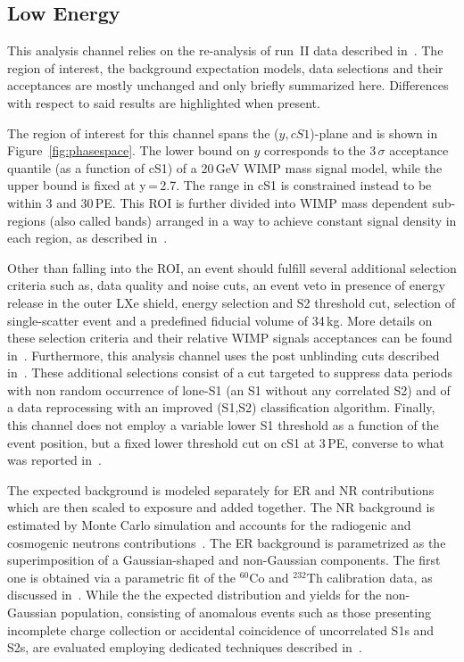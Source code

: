
\subsection{Low Energy}
\label{subsec:LowE}
This analysis channel relies on the re-analysis of run~II data described in~\cite{xe100_run_combination}. The region of interest, the background 
expectation models, data selections and their acceptances are mostly unchanged and only briefly summarized here. Differences with respect to said results are highlighted when present.

The region of interest for this channel spans the ($y,cS1$)-plane and is shown in Figure~\ref{fig:phasespace}.  The lower 
bound on $y$ corresponds to the 3\,$\sigma$ acceptance quantile (as a function of cS1) of a 20\,GeV WIMP mass signal model, while the upper bound is fixed at y\,=\,2.7.
The range in cS1 is constrained instead to be within 3 and 30\,PE. This  ROI is further divided into WIMP mass dependent sub-regions (also called bands) arranged in a way 
to achieve constant signal density in each region, as described in~\cite{xe100_run_combination}.

Other than falling into the ROI, an event should fulfill several additional selection criteria such as, data quality and noise cuts,
an event veto in presence of energy release in the outer LXe shield, energy selection and S2 threshold cut,
selection of single-scatter event and a predefined fiducial volume of 34\,kg. More details on these selection criteria and their 
relative WIMP signals acceptances can be found in~\cite{Aprile:2012vw,xe100_run_combination}. 
Furthermore, this analysis channel uses the post unblinding cuts described in~\cite{xe100_run_combination}. 
These additional selections consist of a cut targeted to suppress data periods with non random occurrence of lone-S1 (an S1 without 
any correlated S2) and of a data reprocessing with an improved (S1,S2) classification algorithm.
Finally, this channel does not employ a variable lower S1 threshold as a function of the event position, but a fixed 
lower threshold cut on cS1 at 3\,PE, converse to what was reported in~\cite{xe100_run_combination}.

The expected background is modeled separately for ER and NR contributions which are then scaled to exposure and added together.
The NR background is estimated by Monte Carlo simulation and accounts for the radiogenic and cosmogenic neutrons
contributions~\cite{Aprile:2013tov}.
The ER background is parametrized as the superimposition of a Gaussian-shaped and non-Gaussian components.
The first one is obtained via a parametric fit of the $^{60}$Co and $^{232}$Th calibration data, as discussed in~\cite{xe100_run10_si}.
While the the expected distribution and yields for the non-Gaussian population, consisting of anomalous events such as those 
presenting incomplete charge collection or accidental coincidence of uncorrelated S1s and S2s,  
are evaluated employing dedicated techniques described in~\cite{xe100_run_combination}.


